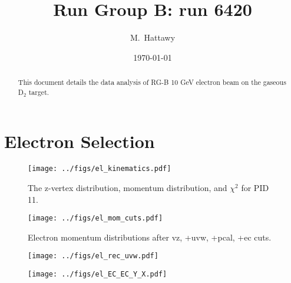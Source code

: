 \documentclass[12pt]{article}
\begin{document}
\title{Run Group B: run 6420}

\vskip 0.5cm

\author{M.~Hattawy}

\date \today
%
\maketitle

\begin{abstract}
This document details the data analysis of RG-B 10 GeV electron beam  on the 
gaseous D$_2$ target.
\end{abstract}

\section{Electron Selection} 

\begin{figure}[h!]
  \begin{center}
    \texttt{[image: ../figs/el\_kinematics.pdf]}
     \caption{The z-vertex distribution, momentum distribution, and $\chi^{2}$ 
     for PID 11.}
    \label{fig:bonus12}
  \end{center}
\end{figure}

\begin{figure}[h!]
  \begin{center}
    \texttt{[image: ../figs/el\_mom\_cuts.pdf]}
     \caption{Electron momentum distributions after vz, +uvw, +pcal, +ec cuts.}
    \label{fig:bonus12}
  \end{center}
\end{figure}




\begin{figure}[h!]
  \begin{center}
    \texttt{[image: ../figs/el\_rec\_uvw.pdf]}
     \caption{ }
    \label{fig:bonus12}
  \end{center}
\end{figure}

\begin{figure}[h!]
  \begin{center}
    \texttt{[image: ../figs/el\_EC\_EC\_Y\_X.pdf]}
     \caption{ }
    \label{fig:bonus12}
  \end{center}
\end{figure}
\end{document}
